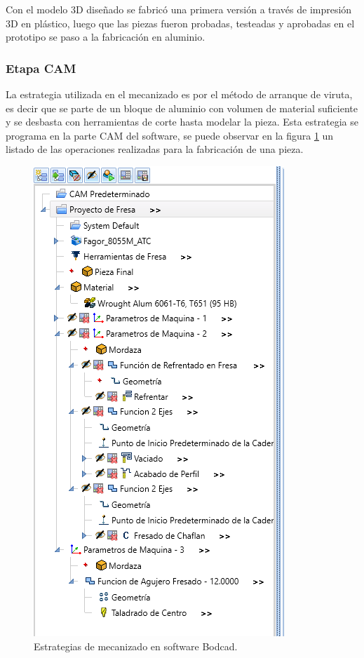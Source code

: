 Con el modelo 3D diseñado se fabricó una primera versión a través de impresión 3D en plástico, luego que las piezas fueron probadas, testeadas y aprobadas en el prototipo se paso a la fabricación en aluminio.

\subsubsection{Etapa CAM}

La estrategia utilizada en el mecanizado es por el método de arranque de viruta, es decir que se parte de un bloque de aluminio con volumen de material suficiente y se desbasta con herramientas de corte hasta modelar la pieza. Esta estrategia se programa en la parte CAM del software, se puede observar en la figura \ref{fig:estrategia} un listado de las operaciones realizadas para la fabricación de una pieza.

\begin{figure}[h]
	\centering
	\includegraphics[width=.6\textwidth]{./Figures/3d_estrategia.png}
	\caption{Estrategias de mecanizado en software Bodcad.}
	\label{fig:estrategia}
\end{figure}

